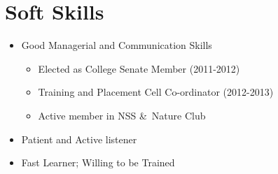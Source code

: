 \documentclass[11pt,a4paper,sans]{moderncv} %
\begin{document}
\begin{comment}
\section{Masters Thesis}

\cvitem{Title}{\emph{Money Is The Root Of All Evil -- Or Is It?}}
\cvitem{Supervisors}{Professor James Smith \& Associate Professor Jane Smith}
\cvitem{Description}{This thesis explored the idea that money has been the cause of untold anguish and suffering in the world. I found that it has, in fact, not.}
\end{comment}



\section{\textbf{Soft Skills}}
		
\cvitem{}
{
\begin{itemize}
	\item Good Managerial and Communication Skills
	\begin{itemize}
		\item Elected as College Senate Member (2011-2012)
		\item Training and Placement Cell Co-ordinator (2012-2013)
		\item Active member in NSS \&\  Nature Club
	\end{itemize}
		\item Patient and Active listener
		\item Fast Learner; Willing to be Trained
\end{itemize}
}


\begin{comment}
\section{Languages}

\cvitemwithcomment{Malayalam}{Mother tongue}{}
\cvitemwithcomment{English}{Mother tongue}{}

\cvitemwithcomment{Spanish}{Intermediate}{Conversationally fluent}
\cvitemwithcomment{Dutch}{Basic}{Basic words and phrases only}
\end{comment}
\end{document}
